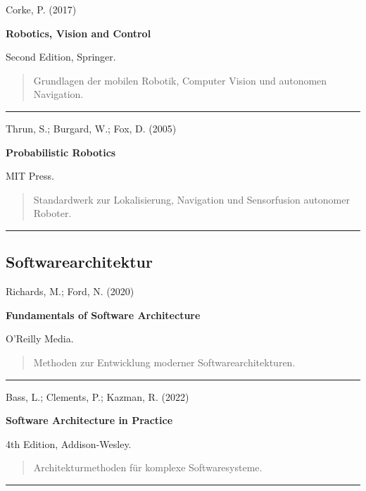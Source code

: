 \documentclass[
  a4paper,
  12pt,
  DIV=12,        %
  parskip=half,  %
  headings=small %
]{scrartcl}
\theoremstyle{definition}
\theoremstyle{definition}
\begin{document}
Corke, P. (2017)

\textbf{Robotics, Vision and Control}

Second Edition, Springer.

\begin{quote}
Grundlagen der mobilen Robotik, Computer Vision und autonomen
Navigation.
\end{quote}

\begin{center}\rule{0.5\linewidth}{0.5pt}\end{center}

Thrun, S.; Burgard, W.; Fox, D. (2005)

\textbf{Probabilistic Robotics}

MIT Press.

\begin{quote}
Standardwerk zur Lokalisierung, Navigation und Sensorfusion autonomer
Roboter.
\end{quote}

\begin{center}\rule{0.5\linewidth}{0.5pt}\end{center}

\subsection{Softwarearchitektur}\label{softwarearchitektur-1}

Richards, M.; Ford, N. (2020)

\textbf{Fundamentals of Software Architecture}

O'Reilly Media.

\begin{quote}
Methoden zur Entwicklung moderner Softwarearchitekturen.
\end{quote}

\begin{center}\rule{0.5\linewidth}{0.5pt}\end{center}

Bass, L.; Clements, P.; Kazman, R. (2022)

\textbf{Software Architecture in Practice}

4th Edition, Addison-Wesley.

\begin{quote}
Architekturmethoden für komplexe Softwaresysteme.
\end{quote}

\begin{center}\rule{0.5\linewidth}{0.5pt}\end{center}
\end{document}
